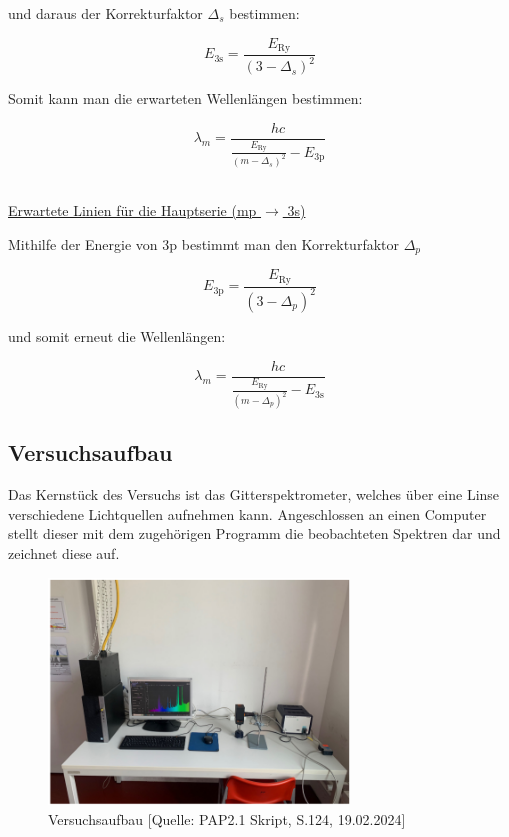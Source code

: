 \documentclass{article}
\begin{document}
und daraus der Korrekturfaktor $\Delta_s$ bestimmen:

\begin{equation}
    E_{\text{3s}} = \frac{E_{\text{Ry}}}{(3 - \Delta_s)^2}
    \label{eq:KorrDelta_s}
\end{equation}

Somit kann man die erwarteten Wellenlängen bestimmen:

\begin{equation}
    \lambda_m = \frac{hc}{\frac{E_{\text{Ry}}}{(m - \Delta_s)^2} - E_{\text{3p}}}
    \label{eq:2NS}
\end{equation}

\hfill \\
\underline{Erwartete Linien für die Hauptserie (mp $\xrightarrow{}$ 3s)}

Mithilfe der Energie von 3p bestimmt man den Korrekturfaktor $\Delta_p$

\begin{equation}
    E_{\text{3p}} = \frac{E_{\text{Ry}}}{(3 - \Delta_p)^2}
    \label{eq:KorrDelta_p}
\end{equation}

und somit erneut die Wellenlängen:

\begin{equation}
    \lambda_m = \frac{hc}{\frac{E_{\text{Ry}}}{(m - \Delta_p)^2} - E_{\text{3s}}}
    \label{eq:HS}
\end{equation}

\subsection{Versuchsaufbau}

Das Kernstück des Versuchs ist das Gitterspektrometer, welches über eine Linse verschiedene Lichtquellen aufnehmen kann. Angeschlossen an einen Computer stellt dieser mit dem zugehörigen Programm die beobachteten Spektren dar und zeichnet diese auf.

\begin{figure}[!h]
    \centering
    \includegraphics[width=8cm]{graphics/versuchsaufbau.png}
    \caption{Versuchsaufbau [Quelle: PAP2.1 Skript, S.124, 19.02.2024]}
    \label{fig:aufbau}
\end{figure}
\end{document}
